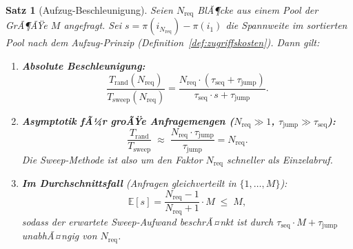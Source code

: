 ﻿\documentclass[a4paper,12pt]{article}
\theoremstyle{definition}
\theoremstyle{plain}
\newtheorem{satz}{Satz}[section]
\begin{document}
\begin{satz}[Aufzug-Beschleunigung]
\label{satz:elevator}
  Seien $N_{\mathrm{req}}$ BlÃ¶cke aus einem Pool der GrÃ¶ÃŸe $M$ angefragt.
  Sei $s = \pi(i_{N_{\mathrm{req}}}) - \pi(i_1)$ die Spannweite im
  sortierten Pool nach dem Aufzug-Prinzip (Definition~\ref{def:zugriffskosten}).
  Dann gilt:

  \begin{enumerate}
    \item \textbf{Absolute Beschleunigung:}
      \[
        \frac{T_{\mathrm{rand}}(N_{\mathrm{req}})}{T_{\mathrm{sweep}}(N_{\mathrm{req}})}
        = \frac{N_{\mathrm{req}} \cdot (\tau_{\mathrm{seq}} + \tau_{\mathrm{jump}})}
               {\tau_{\mathrm{seq}} \cdot s + \tau_{\mathrm{jump}}}.
      \]

    \item \textbf{Asymptotik fÃ¼r groÃŸe Anfragemengen ($N_{\mathrm{req}} \gg 1$,
      $\tau_{\mathrm{jump}} \gg \tau_{\mathrm{seq}}$):}
      \[
        \frac{T_{\mathrm{rand}}}{T_{\mathrm{sweep}}}
        \;\approx\;
        \frac{N_{\mathrm{req}} \cdot \tau_{\mathrm{jump}}}{\tau_{\mathrm{jump}}}
        = N_{\mathrm{req}}.
      \]
      Die Sweep-Methode ist also um den Faktor $N_{\mathrm{req}}$ schneller
      als Einzelabruf.

    \item \textbf{Im Durchschnittsfall} (Anfragen gleichverteilt in
      $\{1, \ldots, M\}$):
      \[
        \mathbb{E}[s] = \frac{N_{\mathrm{req}} - 1}{N_{\mathrm{req}} + 1}
        \cdot M \;\le\; M,
      \]
      sodass der erwartete Sweep-Aufwand beschrÃ¤nkt ist durch
      $\tau_{\mathrm{seq}} \cdot M + \tau_{\mathrm{jump}}$
      unabhÃ¤ngig von $N_{\mathrm{req}}$.
  \end{enumerate}
\end{satz}
\end{document}
